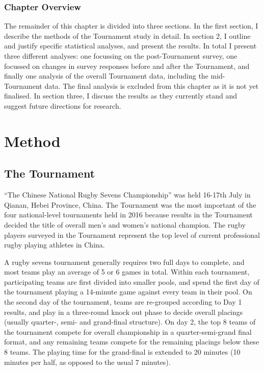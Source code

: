 \subsubsection{Chapter Overview}
The remainder of this chapter is divided into three sections. In the first section,  I describe the methods of the Tournament study in detail. In section 2, I outline and justify specific statistical analyses, and present the  results.  In total I present three different analyses: one focussing on the post-Tournament survey, one focussed on changes in survey responses before and after the Tournament, and finally one analysis of the overall Tournament data, including the mid-Tournament data.  The final analysis is excluded from this chapter as it is not yet finalised.  In section three, I discuss the results as they currently stand and suggest future directions for research.
\clearpage

\section{Method}

  \subsection{The Tournament}
``The Chinese National Rugby Sevens Championship'' was held 16-17th July in Qianan, Hebei Province, China. The Tournament was the most important of the four national-level tournaments held in 2016 because results in the Tournament decided the title of overall men's and women’s national champion. The rugby players surveyed in the Tournament represent the top level of current professional rugby playing athletes in China.

A rugby sevens tournament generally requires two full days to complete, and most teams play an average of 5 or 6 games in total. Within each tournament, participating teams are first divided into smaller pools, and spend the first day of the tournament playing a 14-minute game against every team in their pool. On the second day of the tournament, teams are re-grouped according to Day 1 results, and play in a three-round knock out phase to decide overall placings (usually quarter-, semi- and grand-final structure). On day 2, the top 8 teams of the tournament compete for overall championship in a quarter-semi-grand final format, and any remaining teams compete for the remaining placings below these 8 teams. The playing time for the grand-final is extended to 20 minutes (10 minutes per half, as opposed to the usual 7 minutes).

